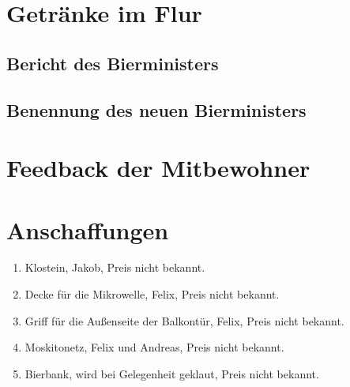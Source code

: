 \documentclass[10pt,a4paper,final]{article}
\begin{document}
\section{Getränke im Flur}
\subsection{Bericht des Bierministers}
\subsection{Benennung des neuen Bierministers}
\section{Feedback der Mitbewohner}
\section{Anschaffungen}
\begin{enumerate}
	\item Klostein, Jakob, Preis nicht bekannt.
	\item Decke für die Mikrowelle, Felix, Preis nicht bekannt.
	\item Griff für die Außenseite der Balkontür, Felix, Preis nicht bekannt.
	\item Moskitonetz, Felix und Andreas, Preis nicht bekannt.
	\item Bierbank, wird bei Gelegenheit geklaut, Preis nicht bekannt.
\end{enumerate}

\end{document}
